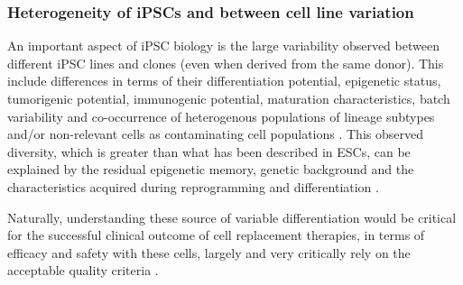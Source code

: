 




\subsubsection{Heterogeneity of iPSCs and between cell line variation}

An important aspect of iPSC biology is the  large variability observed between different iPSC lines and clones (even when derived from the same donor). This include differences
in terms of their differentiation potential, epigenetic status, tumorigenic potential, immunogenic potential, maturation characteristics, batch variability and co-occurrence of heterogenous populations of lineage subtypes and/or non-relevant cells as contaminating cell populations \cite{buganim2013mechanisms}.
This observed diversity, which is greater than what has been described in ESCs, can be explained by the residual epigenetic memory, genetic background and the characteristics acquired during reprogramming and differentiation \cite{kim2010epigenetic, polo2010cell, rouhani2014genetic}.

Naturally, understanding these source of variable differentiation would be critical for the successful clinical outcome of cell replacement therapies, in terms of efficacy and safety with these cells, largely and very critically rely on the acceptable quality criteria \cite{buganim2013mechanisms}. \\

